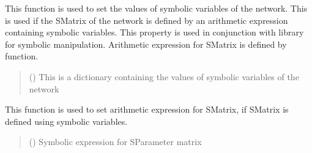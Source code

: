 \documentclass[letterpaper,10pt,english]{sphinxmanual}
\begin{document}
\begin{fulllineitems}
\begin{fulllineitems}
\end{fulllineitems}


\begin{fulllineitems}
\label{\detokenize{touchstone:touchstone.spfile.set_sym_parameters}}
\pysigstartsignatures
{}
\pysigstopsignatures
\sphinxAtStartPar
This function is used to set the values of symbolic variables of the network. This is used if the S\sphinxhyphen{}Matrix of the network is defined by an arithmetic expression containing symbolic variables. This property is used in conjunction with  library for symbolic manipulation. Arithmetic expression for S\sphinxhyphen{}Matrix is defined by  function.
\begin{quote}\begin{description}
\sphinxAtStartPar
{} () \textendash{} This is a dictionary containing the values of symbolic variables of the network

\end{description}\end{quote}

\end{fulllineitems}


\begin{fulllineitems}
\label{\detokenize{touchstone:touchstone.spfile.set_sym_smatrix}}
\pysigstartsignatures
{}
\pysigstopsignatures
\sphinxAtStartPar
This function is used to set arithmetic expression for S\sphinxhyphen{}Matrix, if S\sphinxhyphen{}Matrix is defined using symbolic variables.
\begin{quote}\begin{description}
\sphinxAtStartPar
{} () \textendash{} Symbolic  expression for S\sphinxhyphen{}Parameter matrix


\end{description}
\end{quote}
\end{fulllineitems}
\end{fulllineitems}
\end{document}
